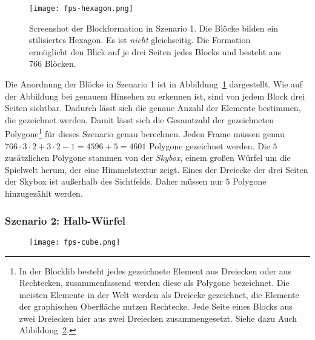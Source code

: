 \begin{figure}
	\centering
	\texttt{[image: fps-hexagon.png]}
	\caption{Screenshot der Blockformation in Szenario 1. Die Blöcke bilden ein stilisiertes Hexagon. Es ist \emph{nicht} gleichseitig. Die Formation ermöglicht den Blick auf je drei Seiten jedes Blocks und besteht aus 766 Blöcken.}\label{fig:hexagon}
\end{figure}
Die Anordnung der Blöcke in Szenario 1 ist in Abbildung~\ref{fig:hexagon} dargestellt. Wie auf der Abbildung bei genauem Hinsehen zu erkennen ist, sind von jedem Block drei Seiten sichtbar. Dadurch lässt sich die genaue Anzahl der Elemente bestimmen, die gezeichnet werden. Damit lässt sich die Gesamtzahl der gezeichneten Polygone\footnote{In der Blocklib besteht jedes gezeichnete Element aus Dreiecken oder aus Rechtecken, zusammenfassend werden diese als Polygone bezeichnet. Die meisten Elemente in der Welt werden als Dreiecke gezeichnet, die Elemente der graphischen Oberfläche nutzen Rechtecke. Jede Seite eines Blocks aus zwei Dreiecken hier aus zwei Dreiecken zusammengesetzt. Siehe dazu Auch Abbildung~\ref{fig:cube}.} für dieses Szenario genau berechnen. Jeden Frame müssen genau $766\cdot3\cdot2 + 3\cdot2-1 = 4596 +5 = 4601$ Polygone gezeichnet werden. Die $5$ zusätzlichen Polygone stammen von der \emph{Skybox}, einem großen Würfel um die Spielwelt herum, der eine Himmelstextur zeigt. Eines der Dreiecke der drei Seiten der Skybox ist außerhalb des Sichtfelds. Daher müssen nur $5$ Polygone hinzugezählt werden.

\begin{figure}
\end{figure}
\begin{figure}
\end{figure}

\begin{figure}
\end{figure}






\subsubsection{Szenario 2: Halb-Würfel}

\begin{figure}
	\centering
	\texttt{[image: fps-cube.png]}
	\caption{}\label{fig:cube}
\end{figure}
